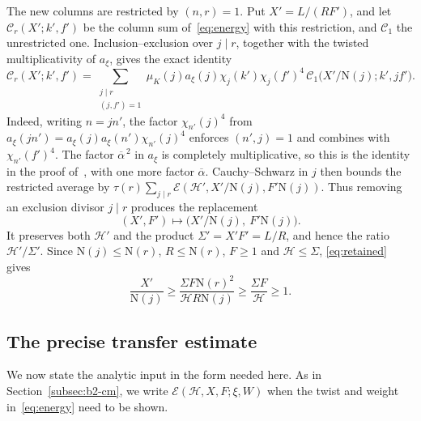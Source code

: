 \documentclass[11pt]{article}
\numberwithin{equation}{section}
\newcommand{\N}{\mathrm N}
\newcommand{\muk}{\mu_K}
\newcommand{\E}{\mathcal E}
\begin{document}
The new columns are restricted by $(n,r)=1$. Put $X'=L/(RF')$, and let
$\mathcal C_r(X';k',f')$ be the column sum of~\eqref{eq:energy} with this
restriction, and $\mathcal C_1$ the unrestricted one. Inclusion--exclusion over
$j\mid r$, together with the twisted multiplicativity of $a_\xi$, gives
the exact identity
\begin{equation}\label{eq:exclusionid}
 \mathcal C_r(X';k',f')=\sum_{\substack{j\mid r\\(j,f')=1}}\muk(j)a_\xi(j)
 \chi_j(k')\chi_j(f')^4\,\mathcal C_1\bigl(X'/\N(j);k',jf'\bigr).
\end{equation}
Indeed, writing $n=jn'$, the factor $\chi_{n'}(j)^4$ from
$a_\xi(jn')=a_\xi(j)a_\xi(n')\chi_{n'}(j)^4$ enforces $(n',j)=1$ and
combines with $\chi_{n'}(f')^4$. The factor $\overline{\alpha}^{\,2}$ in $a_\xi$ is
completely multiplicative, so this is the identity in the proof
of~\cite[Lemma~4.4]{OAI1112}, with one more factor $\overline{\alpha}$.
Cauchy--Schwarz in $j$ then bounds the restricted average by
$\tau(r)\sum_{j\mid r}\E(\mathcal H',X'/\N(j),F'\N(j))$.
Thus removing an exclusion divisor $j\mid r$ produces the replacement
\begin{equation}\label{eq:exclusionswap}
 (X',F')\longmapsto\bigl(X'/\N(j),\ F'\N(j)\bigr).
\end{equation}
It preserves both $\mathcal H'$ and the product $\Sigma'=X'F'=L/R$,
and hence the ratio $\mathcal H'/\Sigma'$. Since $\N(j)\le\N(r)$,
$R\le\N(r)$, $F\ge1$ and $\mathcal H\le\Sigma$, \eqref{eq:retained} gives
\begin{equation}\label{eq:childcolumn}
 \frac{X'}{\N(j)}\ge\frac{\Sigma F\N(r)^2}{\mathcal HR\N(j)}
 \ge\frac{\Sigma F}{\mathcal H}\ge1.
\end{equation}

\subsection{The precise transfer estimate}
We now state the analytic input in the form needed here. As in
Section~\ref{subsec:b2-cm}, we write $\E(\mathcal H,X,F;\xi,W)$ when the twist and weight
in~\eqref{eq:energy} need to be shown.
\end{document}
